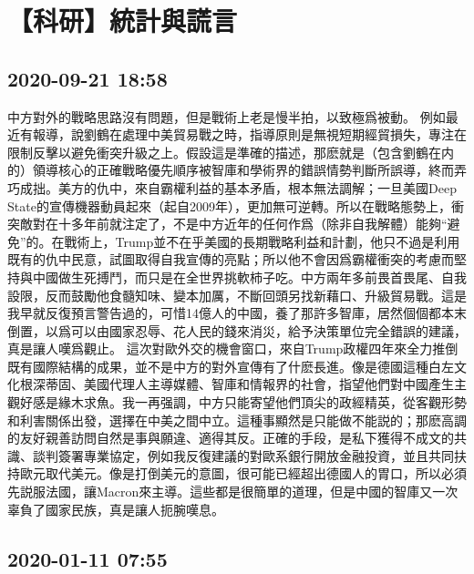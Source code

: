\documentclass[twocolumn]{ctexart}
\begin{document}
\section*{【科研】統計與謊言}
\subsection*{2020-09-21 18:58}

中方對外的戰略思路沒有問題，但是戰術上老是慢半拍，以致極爲被動。
例如最近有報導，說劉鶴在處理中美貿易戰之時，指導原則是無視短期經貿損失，專注在限制反擊以避免衝突升級之上。假設這是準確的描述，那麽就是（包含劉鶴在内的）領導核心的正確戰略優先順序被智庫和學術界的錯誤情勢判斷所誤導，終而弄巧成拙。美方的仇中，來自霸權利益的基本矛盾，根本無法調解；一旦美國Deep State的宣傳機器動員起來（起自2009年），更加無可逆轉。所以在戰略態勢上，衝突敵對在十多年前就注定了，不是中方近年的任何作爲（除非自我解體）能夠“避免”的。在戰術上，Trump並不在乎美國的長期戰略利益和計劃，他只不過是利用既有的仇中民意，試圖取得自我宣傳的亮點；所以他不會因爲霸權衝突的考慮而堅持與中國做生死搏鬥，而只是在全世界挑軟柿子吃。中方兩年多前畏首畏尾、自我設限，反而鼓勵他食髓知味、變本加厲，不斷回頭另找新藉口、升級貿易戰。這是我早就反復預言警告過的，可惜14億人的中國，養了那許多智庫，居然個個都本末倒置，以爲可以由國家忍辱、花人民的錢來消災，給予決策單位完全錯誤的建議，真是讓人嘆爲觀止。
這次對歐外交的機會窗口，來自Trump政權四年來全力推倒既有國際結構的成果，並不是中方的對外宣傳有了什麽長進。像是德國這種白左文化根深蒂固、美國代理人主導媒體、智庫和情報界的社會，指望他們對中國產生主觀好感是緣木求魚。我一再强調，中方只能寄望他們頂尖的政經精英，從客觀形勢和利害關係出發，選擇在中美之間中立。這種事顯然是只能做不能説的；那麽高調的友好親善訪問自然是事與願違、適得其反。正確的手段，是私下獲得不成文的共識、談判簽署專業協定，例如我反復建議的對歐系銀行開放金融投資，並且共同扶持歐元取代美元。像是打倒美元的意圖，很可能已經超出德國人的胃口，所以必須先説服法國，讓Macron來主導。這些都是很簡單的道理，但是中國的智庫又一次辜負了國家民族，真是讓人扼腕嘆息。
\subsection*{2020-01-11 07:55}
\end{document}
